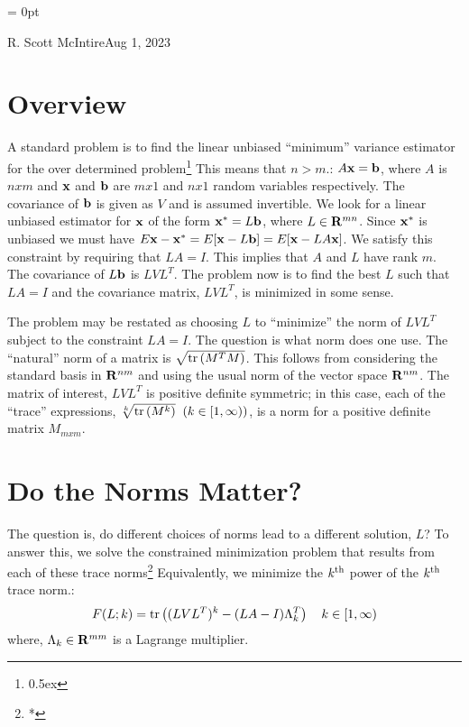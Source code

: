 

\parindent = 0pt

{R. Scott McIntire}{Aug 1, 2023}

\parskip=8pt


\section{Overview}
A standard problem is to find the linear unbiased ``minimum'' variance estimator
for the over determined problem\footnote{\kern 0.5pt \raise 0.5ex \hbox{\dag}}
{This means that $n > m$.}: $A {\bf x} = {\bf b}$, where 
$A$ is $nxm$ and ${\bf x}$ and
${\bf b}$ are $mx1$ and $nx1$ random variables respectively. The
covariance of ${\bf b}$ is given as $V$ and is assumed invertible. 
We look for a linear unbiased estimator for ${\bf x}$ of the form 
${\bf x}^* = L {\bf b}$, where $L\in {\bf R}^{mn}$. Since ${\bf x}^*$
is unbiased we must have 
$E{{\bf x} - {\bf x}^*} = E[{\bf x} - L
  {\bf b}] = E[{\bf x} - LA{\bf x}]$. We satisfy this constraint by
requiring that $LA = I$. This implies that $A$ and $L$ have rank $m$.
The covariance of $L{\bf b}$ is $LVL^T$. The problem now is to find
the best $L$ such that $LA = I$ and the covariance matrix, $LVL^T$, is
minimized in some sense.

The problem may be restated as choosing $L$ to ``minimize'' the norm of $LVL^T$
subject to the constraint $LA = I$. The question is what norm does one
use. The ``natural'' norm of a matrix is $\sqrt{{\rm
    tr}\left(M^TM\right)}$. This 
    follows from considering the standard basis in ${\bf R}^{nm}$ and
    using the usual norm of the vector space ${\bf R}^{nm}$. 
The matrix of interest, $LVL^T$ is positive definite
    symmetric; in this case, each of the ``trace'' 
expressions, $\root k \of {{\rm
          tr}\left(M^k\right)} \;\; (k \in [1,\infty ))$, is a norm for a 
positive definite matrix $M_{mxm}$.

\section{Do the Norms Matter?}
The question is, do different choices of norms lead to a different
solution, $L$? To answer this, we solve the constrained minimization 
problem that results from each of these trace norms\footnote{\kern 0.5pt *}
{Equivalently, we minimize the $k^{\rm th}$ power
of the $k^{\rm th}$ trace norm.}:
$$
F(L; k) = {\rm tr}\left((LVL^T)^k - (LA - I)\Lambda_{k}^T\right) 
\quad k \in [1,\infty)
$$
where, $\Lambda_k \in {\bf R}^{mm}$ is a Lagrange multiplier.

